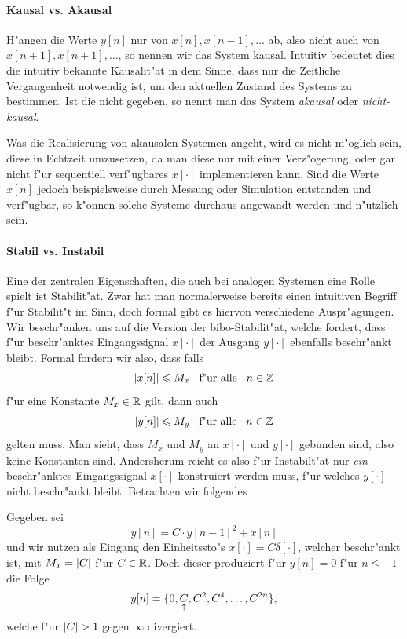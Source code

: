 \paragraph{Kausal vs. Akausal} 
H"angen die Werte $y[n]$ nur von $x[n], x[n-1], \dots$ ab, also nicht auch von $x[n+1], x[n+1], \dots$, so nennen wir das System kausal.
Intuitiv bedeutet dies die intuitiv bekannte Kausalit"at in dem Sinne, dass nur die Zeitliche Vergangenheit notwendig ist, um den aktuellen Zustand des Systems zu bestimmen.
Ist die nicht gegeben, so nennt man das System \emph{akausal} oder \emph{nicht-kausal}.

Was die Realisierung von akausalen Systemen angeht, wird es nicht m"oglich sein, diese in Echtzeit umzusetzen, da man diese nur mit einer Verz"ogerung, oder gar nicht f"ur sequentiell verf"ugbares $x[\cdot]$ implementieren kann.
Sind die Werte $x[n]$ jedoch beispielsweise durch Messung oder Simulation entstanden und  verf"ugbar, so k"onnen solche Systeme durchaus angewandt werden und n"utzlich sein.

\paragraph{Stabil vs. Instabil} Eine der zentralen Eigenschaften, die auch bei analogen Systemen eine Rolle spielt ist Stabilit"at.
Zwar hat man normalerweise bereits einen intuitiven Begriff f"ur Stabilit"t im Sinn, doch formal gibt es hiervon verschiedene Auspr"agungen.
Wir beschr"anken uns auf die Version der \gls{bibo}-Stabilit"at, welche fordert, dass f"ur beschr"anktes Eingangssignal $x[\cdot]$ der Ausgang $y[\cdot]$ ebenfalls beschr"ankt bleibt.
Formal fordern wir also, dass falls
\[
{\left| x[n] \right|} \leqslant M_x {\hspace{3mm} \text{f"ur alle} \hspace{3mm}} n \in \mathbb{Z}
\]
f"ur eine Konstante $M_x \in \mathbb{R}$ gilt, dann auch 
\[
{\left| y[n] \right|} \leqslant M_y {\hspace{3mm} \text{f"ur alle} \hspace{3mm}} n \in \mathbb{Z}
\]
gelten muss. 
Man sieht, dass $M_x$ und $M_y$ an $x[\cdot]$ und $y[\cdot]$ gebunden sind, also keine  Konstanten sind.
Andersherum reicht es also f"ur Instabilt"at nur \emph{ein} beschr"anktes Eingangssignal $x[\cdot]$ konstruiert werden muss, f"ur welches $y[\cdot]$ nicht beschr"ankt bleibt.
Betrachten wir folgendes
\begin{Exm}
Gegeben sei
\[
y[n] = C \cdot y[n-1]^2 + x[n]
\]
und wir nutzen als Eingang den Einheitssto"s $x[\cdot] = C \delta[\cdot]$, welcher beschr"ankt ist, mit $M_x = {\left| C \right|}$ f"ur $C \in \mathbb{R}$.
Doch dieser produziert f"ur $y[n] = 0$ f"ur $n \leqslant -1$ die Folge
\[
y[n] = \{0, \underset{\uparrow}{C}, C^2, C^4, \dots, C^{2n}\},
\]
welche f"ur ${\left| C \right|} > 1$ gegen $\infty$ divergiert.
\end{Exm}

